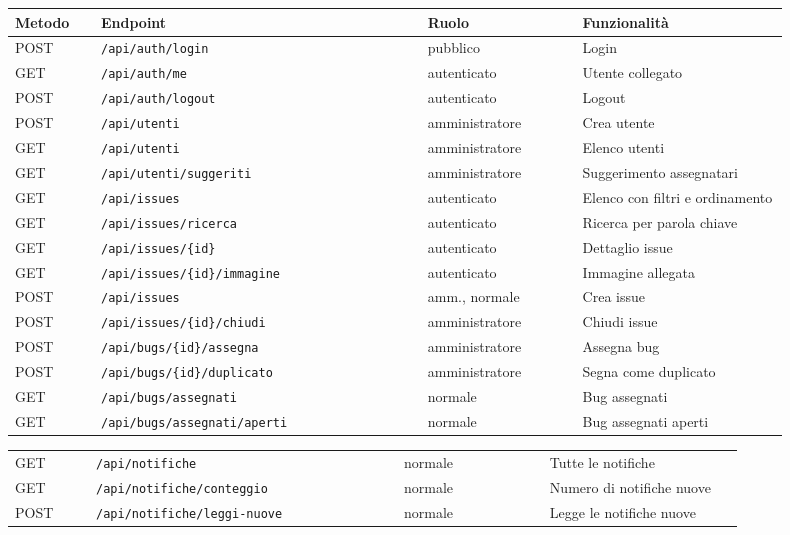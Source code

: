 \begin{center}
\renewcommand{\arraystretch}{1.4}
\begin{tabular}{|p{0.10\linewidth}|p{0.38\linewidth}|p{0.18\linewidth}|p{0.24\linewidth}|}
\hline
\textbf{Metodo} & \textbf{Endpoint} & \textbf{Ruolo} & \textbf{Funzionalità} \\
\hline
POST & \texttt{/api/auth/login} & pubblico & Login \\
GET & \texttt{/api/auth/me} & autenticato & Utente collegato \\
POST & \texttt{/api/auth/logout} & autenticato & Logout \\
\hline
POST & \texttt{/api/utenti} & amministratore & Crea utente \\
GET & \texttt{/api/utenti} & amministratore & Elenco utenti \\
GET & \texttt{/api/utenti/suggeriti} & amministratore & Suggerimento assegnatari \\
\hline
GET & \texttt{/api/issues} & autenticato & Elenco con filtri e ordinamento \\
GET & \texttt{/api/issues/ricerca} & autenticato & Ricerca per parola chiave \\
GET & \texttt{/api/issues/\{id\}} & autenticato & Dettaglio issue \\
GET & \texttt{/api/issues/\{id\}/immagine} & autenticato & Immagine allegata \\
POST & \texttt{/api/issues} & amm., normale & Crea issue \\
POST & \texttt{/api/issues/\{id\}/chiudi} & amministratore & Chiudi issue \\
\hline
POST & \texttt{/api/bugs/\{id\}/assegna} & amministratore & Assegna bug \\
POST & \texttt{/api/bugs/\{id\}/duplicato} & amministratore & Segna come duplicato \\
GET & \texttt{/api/bugs/assegnati} & normale & Bug assegnati \\
GET & \texttt{/api/bugs/assegnati/aperti} & normale & Bug assegnati aperti \\
\end{tabular}
\end{center}

\begin{center}
\renewcommand{\arraystretch}{1.4}
\begin{tabular}{|p{0.10\linewidth}|p{0.38\linewidth}|p{0.18\linewidth}|p{0.24\linewidth}|}
GET & \texttt{/api/notifiche} & normale & Tutte le notifiche \\
GET & \texttt{/api/notifiche/conteggio} & normale & Numero di notifiche nuove \\
POST & \texttt{/api/notifiche/leggi-nuove} & normale & Legge le notifiche nuove \\
\hline
\end{tabular}
\end{center}

